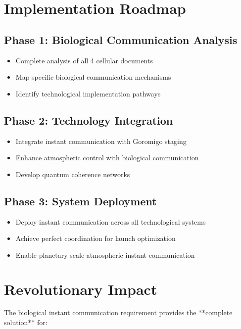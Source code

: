 \documentclass[12pt,a4paper]{article}
\begin{document}
\section{Implementation Roadmap}

\subsection{Phase 1: Biological Communication Analysis}
\begin{itemize}
\item Complete analysis of all 4 cellular documents
\item Map specific biological communication mechanisms
\item Identify technological implementation pathways
\end{itemize}

\subsection{Phase 2: Technology Integration}
\begin{itemize}
\item Integrate instant communication with Goromigo staging
\item Enhance atmospheric control with biological communication
\item Develop quantum coherence networks
\end{itemize}

\subsection{Phase 3: System Deployment}
\begin{itemize}
\item Deploy instant communication across all technological systems
\item Achieve perfect coordination for launch optimization
\item Enable planetary-scale atmospheric instant communication
\end{itemize}

\section{Revolutionary Impact}

The biological instant communication requirement provides the **complete solution** for:
\end{document}
